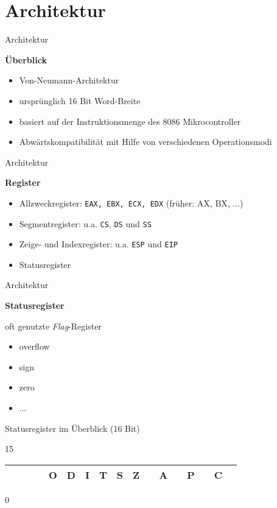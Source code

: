 \section{Architektur}

\begin{frame}{Architektur}
    \begin{center}
    \textbf{Überblick}
    \end{center}

    \begin{itemize}
        \item Von-Neumann-Architektur
        \item ursprünglich 16 Bit Word-Breite
        \item basiert auf der Instruktionsmenge des 8086 Mikrocontroller
        \item Abwärtskompatibilität mit Hilfe von verschiedenen Operationsmodi
    \end{itemize}
\end{frame}


\begin{frame}{Architektur}
    \begin{center}
    \textbf{Register}
    \end{center}

    \begin{itemize}
        \item Allzweckregister: \texttt{EAX, EBX, ECX, EDX} (früher: AX, BX, ...)
        \item Segmentregister: u.a. \texttt{CS}, \texttt{DS} und \texttt{SS}
        \item Zeige- und Indexregister: u.a. \texttt{ESP} und \texttt{EIP}
        \item Statusregister
    \end{itemize}
\end{frame}


\begin{frame}{Architektur}
    \begin{center}
    \textbf{Statusregister}
    \end{center}

    oft genutzte \textit{Flag}-Register
    \begin{itemize}
        \item overflow
        \item sign
        \item zero
        \item ...
    \end{itemize}

    \makebox{}

    Statusregister im Überblick (16 Bit)
    \begin{center}
        {\small 15}
        \begin{tabular}{|c|c|c|c|c|c|c|c|c|c|c|c|c|c|c|c|c|}
        \hline & & & & O & D & I & T & S & Z & & A & & P & & C \\
        \hline
        \end{tabular}
        {\small 0}
    \end{center}
\end{frame}

